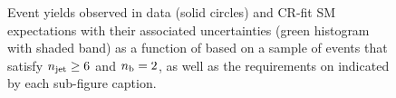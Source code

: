 \begin{figure}[h!]
\begin{center}
    \caption{Event yields observed in data (solid circles) and CR-fit SM expectations with their associated uncertainties (green histogram with shaded band) as a function of \HTmiss based on a sample of events that satisfy $n_{\text{jet}} \geq 6$ and $n_{\text{b}} = 2$, as well as the requirements on \scalht indicated by each sub-figure caption. }
    \label{fig:mhtdim_ge6j_eq2b}
  \end{center}
\end{figure}

